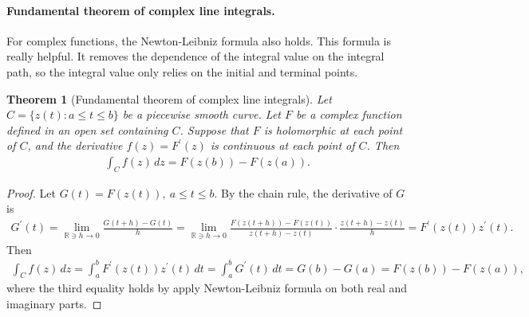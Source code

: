 \documentclass{article}
\numberwithin{equation}{section}
\newcommand{\bbR}{\mathbb{R}}
\theoremstyle{plain}
\newtheorem{theorem}{Theorem}[section]
\theoremstyle{definition}
\begin{document}
\paragraph{Fundamental theorem of complex line integrals.} For complex functions, the Newton-Leibniz formula also holds. This formula is really helpful. It removes the dependence of the integral value on the integral path, so the integral value only relies on the initial and terminal points.
\begin{theorem}[Fundamental theorem of complex line integrals]\label{newtonleb}
Let $C=\{z(t):a\leq t\leq b\}$ be a piecewise smooth curve. Let $F$ be a complex function defined in an open set containing $C$. Suppose that $F$ is holomorphic at each point of $C$, and the derivative $f(z)=F^\prime(z)$ is continuous at each point of $C$. Then
\begin{align*}
	\int_C f(z)\,dz=F(z(b))-F(z(a)).
\end{align*}
\end{theorem}
\begin{proof}
Let $G(t)=F(z(t)),\ a\leq t\leq b$. By the chain rule, the derivative of $G$ is
\begin{align*}
	G^\prime(t)=\lim_{\bbR\ni h\to 0}\frac{G(t+h)-G(t)}{h}=\lim_{\bbR\ni h\to 0}\frac{F(z(t+h))-F(z(t))}{z(t+h)-z(t)}\cdot\frac{z(t+h)-z(t)}{h}=F^\prime(z(t))z^\prime(t).
\end{align*}
Then
\begin{align*}
	\int_C f(z)\,dz=\int_a^b F^\prime(z(t))z^\prime(t)\,dt=\int_a^b G^\prime(t)\,dt=G(b)-G(a)=F(z(b))-F(z(a)),
\end{align*}
where the third equality holds by apply Newton-Leibniz formula on both real and imaginary parts.
\end{proof}
\end{document}
